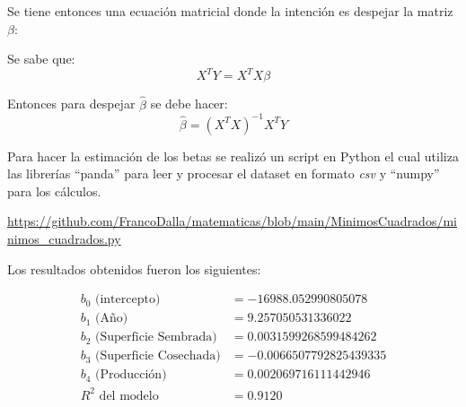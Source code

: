 \documentclass[spanish,12pt,a4paper]{article}
\begin{document}
\begin{enumerate}[label=\alph*)]
		
		Se tiene entonces una ecuación matricial donde la intención es despejar la matriz $\beta$:
		
		Se sabe que:
		\[
		X^T Y = X^T X\beta
		\]
		
		Entonces para despejar $\hat{\beta}$ se debe hacer:
		\[
		\hat{\beta} = (X^T X)^{-1} X^T Y
		\]
		
		Para hacer la estimación de los betas se realizó un script en Python el cual utiliza las librerías ``panda'' para leer y procesar el dataset en formato \textit{csv} y ``numpy'' para los cálculos.
		
		\url{https://github.com/FrancoDalla/matematicas/blob/main/MinimosCuadrados/minimos_cuadrados.py}
		
		Los resultados obtenidos fueron los siguientes:
		
		\begin{align*}
			b_0 \text{ (intercepto)} &= -16988.052990805078 \\
			b_1 \text{ (Año)} &= 9.257050531336022 \\
			b_2 \text{ (Superficie Sembrada)} &= 0.0031599268599484262 \\
			b_3 \text{ (Superficie Cosechada)} &= -0.0066507792825439335 \\
			b_4 \text{ (Producción)} &= 0.002069716111442946 \\
			R^2 \text{ del modelo} &= 0.9120
		\end{align*}
		

\end{enumerate}
\end{document}
